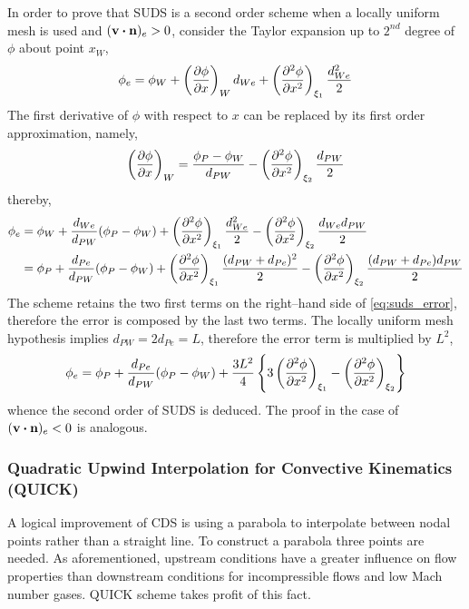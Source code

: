In order to prove that SUDS is a second order scheme when a locally uniform mesh is used and $(\vb{v} \vdot \vb{n})_e > 0$, consider the Taylor expansion up to $2^{nd}$ degree of $\phi$ about point $x_W$,
\begin{equation}
	\phi_e = 
	\phi_W + 
	\left( \pdv{\phi}{x} \right)_W d_{We} + 
	\left( \pdv[2]{\phi}{x} \right)_{\xi_1} \frac{d_{We}^2}{2}
\end{equation}
The first derivative of $\phi$ with respect to $x$ can be replaced by its first order approximation, namely,
\begin{equation}
	\left(\pdv{\phi}{x}\right)_W = 
	\frac{\phi_P - \phi_W}{d_{PW}} - \left(\pdv[2]{\phi}{x}\right)_{\xi_2} \frac{d_{PW}}{2}
\end{equation}
thereby,
\begin{align}
	\phi_e 
	&= 
	\phi_W + 
	\frac{d_{We}}{d_{PW}} (\phi_P - \phi_W) + 
	\left( \pdv[2]{\phi}{x} \right)_{\xi_1} \frac{d_{We}^2}{2} - 
	\left( \pdv[2]{\phi}{x} \right)_{\xi_2} \frac{d_{We} d_{PW}}{2} \nonumber \\
	&= 
	\phi_P + 
	\frac{d_{Pe}}{d_{PW}} (\phi_P - \phi_W) + 
	\left( \pdv[2]{\phi}{x} \right)_{\xi_1} \frac{(d_{PW} + d_{Pe})^2}{2} - 
	\left( \pdv[2]{\phi}{x} \right)_{\xi_2} \frac{(d_{PW} + d_{Pe}) d_{PW}}{2}	
	\label{eq:suds_error}
\end{align}
The scheme retains the two first terms on the right--hand side of \eqref{eq:suds_error}, therefore the error is composed by the last two terms. The locally uniform mesh hypothesis implies $d_{PW} = 2 d_{Pe} = L$, therefore the error term is multiplied by $L^2$,
\begin{equation}
	\phi_e = 
	\phi_P + \frac{d_{Pe}}{d_{PW}} (\phi_P - \phi_W) + 
	\frac{3 L^2}{4}
	\left\{
	3 \left( \pdv[2]{\phi}{x} \right)_{\xi_1} - \left( \pdv[2]{\phi}{x} \right)_{\xi_2}
	\right\}
\end{equation}
whence the second order of SUDS is deduced. The proof in the case of $(\vb{v} \vdot \vb{n})_e < 0$ is analogous.


\subsubsection{Quadratic Upwind Interpolation for Convective Kinematics (QUICK)}

A logical improvement of CDS is using a parabola to interpolate between nodal points rather than a straight line. To construct a parabola three points are needed. As aforementioned, upstream conditions have a greater influence on flow properties than downstream conditions for incompressible flows and low Mach number gases. QUICK scheme takes profit of this fact. 

